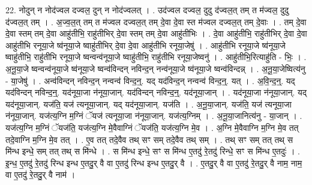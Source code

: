 \documentclass[17pt]{extarticle}
\begin{document}
22. नोदुन् न नोद॑ज्वल दज्वल॒ दुन् न नोद॑ज्वलत् । . उद॑ज्वल दज्वल॒ दुदु द॑ज्वल॒त् तम् त म॑ज्वल॒ दुदु द॑ज्वल॒त् तम् । . अ॒ज्व॒ल॒त् तम् त म॑ज्वल दज्वल॒त् तम् दे॒वा दे॒वा स्त म॑ज्वल दज्वल॒त् तम् दे॒वाः । . तम् दे॒वा दे॒वा स्तम् तम् दे॒वा आहु॑तीभि॒ राहु॑तीभिर् दे॒वा स्तम् तम् दे॒वा आहु॑तीभिः । . दे॒वा आहु॑तीभि॒ राहु॑तीभिर् दे॒वा दे॒वा आहु॑तीभि रनूया॒जे ष्व॑नूया॒जे ष्वाहु॑तीभिर् दे॒वा दे॒वा आहु॑तीभि रनूया॒जेषु॑ । . आहु॑तीभि रनूया॒जे ष्व॑नूया॒जे ष्वाहु॑तीभि॒ राहु॑तीभि रनूया॒जे ष्वन्वन्व॑नूया॒जे ष्वाहु॑तीभि॒ राहु॑तीभि रनूया॒जेष्वनु॑ । . आहु॑तीभि॒रित्याहु॑ति - भिः॒ । . अ॒नू॒या॒जे ष्वन्वन्व॑नूया॒जे ष्व॑नूया॒जे ष्वन्व॑विन्दन् नविन्द॒न् नन्व॑नूया॒जे ष्व॑नूया॒जे ष्वन्व॑विन्दन्न् । . अ॒नू॒या॒जेष्वित्य॑नु - या॒जेषु॑ । . अन्व॑विन्दन् नविन्द॒न् नन्वन्व॑ विन्द॒न्॒. यद् यद॑विन्द॒न् नन्वन्व॑ विन्द॒न्॒. यत् । . अ॒वि॒न्द॒न्॒. यद् यद॑विन्दन् नविन्द॒न्॒. यद॑नूया॒जा न॑नूया॒जान्. यद॑विन्दन् नविन्द॒न्॒. यद॑नूया॒जान् । . यद॑नूया॒जा न॑नूया॒जान्. यद् यद॑नूया॒जान्. यज॑ति॒ यज॑ त्यनूया॒जान्. यद् यद॑नूया॒जान्. यज॑ति । . अ॒नू॒या॒जान्. यज॑ति॒ यज॑ त्यनूया॒जा न॑नूया॒जान्. यज॑त्य॒ग्नि म॒ग्निं ॅयज॑ त्यनूया॒जा न॑नूया॒जान्. यज॑त्य॒ग्निम् । . अ॒नू॒या॒जानित्य॑नु - या॒जान् । . यज॑त्य॒ग्नि म॒ग्निं ॅयज॑ति॒ यज॑त्य॒ग्नि मे॒वैवाग्निं ॅयज॑ति॒ यज॑त्य॒ग्नि मे॒व । . अ॒ग्नि मे॒वैवाग्नि म॒ग्नि मे॒व तत् तदे॒वाग्नि म॒ग्नि मे॒व तत् । . ए॒व तत् तदे॒वैव तथ् सꣳ सम् तदे॒वैव तथ् सम् । . तथ् सꣳ सम् तत् तथ् स मि॑न्ध इन्धे॒ सम् तत् तथ् स मि॑न्धे । . स मि॑न्ध इन्धे॒ सꣳ स मि॑न्ध ए॒तदु॑ रे॒तदु॑ रिन्धे॒ सꣳ स मि॑न्ध ए॒तदुः॑ । . इ॒न्ध॒ ए॒तदु॑ रे॒तदु॑ रिन्ध इन्ध ए॒तदु॒र् वै वा ए॒तदु॑ रिन्ध इन्ध ए॒तदु॒र् वै । . ए॒तदु॒र् वै वा ए॒तदु॑ रे॒तदु॒र् वै नाम॒ नाम॒ वा ए॒तदु॑ रे॒तदु॒र् वै नाम॑ । \newline
\end{document}
